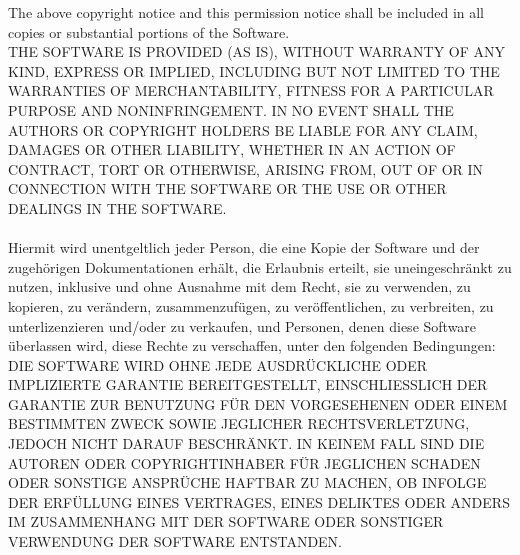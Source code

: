 \documentclass[fontsize=10pt, listof = totoc]{scrartcl}
\begin{document}
The above copyright notice and this permission notice shall be included in all copies or substantial portions of the Software.\\

THE SOFTWARE IS PROVIDED (AS IS), WITHOUT WARRANTY OF ANY KIND, EXPRESS OR IMPLIED, INCLUDING BUT NOT LIMITED TO THE WARRANTIES OF MERCHANTABILITY, FITNESS FOR A PARTICULAR PURPOSE AND NONINFRINGEMENT. IN NO EVENT SHALL THE AUTHORS OR COPYRIGHT HOLDERS BE LIABLE FOR ANY CLAIM, DAMAGES OR OTHER LIABILITY, WHETHER IN AN ACTION OF CONTRACT, TORT OR OTHERWISE, ARISING FROM, OUT OF OR IN CONNECTION WITH THE SOFTWARE OR THE USE OR OTHER DEALINGS IN THE SOFTWARE.\\

\hrulefill\\

Hiermit wird unentgeltlich jeder Person, die eine Kopie der Software und der zugehörigen Dokumentationen erhält, die Erlaubnis erteilt, sie uneingeschränkt zu nutzen, inklusive und ohne Ausnahme mit dem Recht, sie zu verwenden, zu kopieren, zu verändern, zusammenzufügen, zu veröffentlichen, zu verbreiten, zu unterlizenzieren und/oder zu verkaufen, und Personen, denen diese Software überlassen wird, diese Rechte zu verschaffen, unter den folgenden Bedingungen:\\

DIE SOFTWARE WIRD OHNE JEDE AUSDRÜCKLICHE ODER IMPLIZIERTE GARANTIE BEREITGESTELLT, EINSCHLIESSLICH DER GARANTIE ZUR BENUTZUNG FÜR DEN VORGESEHENEN ODER EINEM BESTIMMTEN ZWECK SOWIE JEGLICHER RECHTSVERLETZUNG, JEDOCH NICHT DARAUF BESCHRÄNKT. IN KEINEM FALL SIND DIE AUTOREN ODER COPYRIGHTINHABER FÜR JEGLICHEN SCHADEN ODER SONSTIGE ANSPRÜCHE HAFTBAR ZU MACHEN, OB INFOLGE DER ERFÜLLUNG EINES VERTRAGES, EINES DELIKTES ODER ANDERS IM ZUSAMMENHANG MIT DER SOFTWARE ODER SONSTIGER VERWENDUNG DER SOFTWARE ENTSTANDEN.
\end{document}
